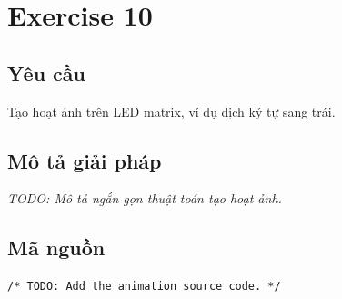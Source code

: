 \section{Exercise 10}

\subsection{Yêu cầu}
Tạo hoạt ảnh trên LED matrix, ví dụ dịch ký tự sang trái.

\subsection{Mô tả giải pháp}
\textit{TODO: Mô tả ngắn gọn thuật toán tạo hoạt ảnh.}

\subsection{Mã nguồn}
\begin{lstlisting}[caption={LED matrix animation -- Exercise 10}]
/* TODO: Add the animation source code. */
\end{lstlisting}
